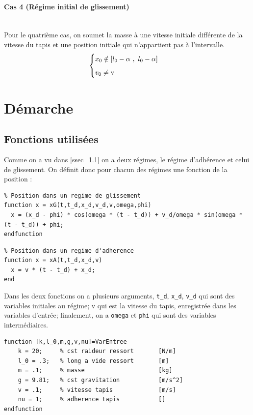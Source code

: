 \documentclass{article}
\begin{document}
\paragraph{Cas 4 (Régime initial de glissement)}\label{par_1.2.0.4}
\mbox{}\\
Pour le quatrième cas, on soumet la masse à une vitesse initiale différente de la vitesse du tapis et une position initiale qui n'appartient pas à l'intervalle.
$$
\begin{cases}
	\vspace{.2cm}
	x_0 \notin [l_0-\alpha~,~l_0-\alpha]\\
	v_0\neq \text{v}
\end{cases}
$$
\newpage
\section{Démarche}\label{sec_2}
\subsection{Fonctions utilisées}\label{ssec_2.1}
Comme on a vu dans \ref{ssec_1.1} on a deux régimes, le régime d'adhérence et celui de glissement. On définit donc pour chacun des régimes une fonction de la position : 

\begin{lstlisting}
% Position dans un regime de glissement
function x = xG(t,t_d,x_d,v_d,v,omega,phi)
  x = (x_d - phi) * cos(omega * (t - t_d)) + v_d/omega * sin(omega * (t - t_d)) + phi;
endfunction
\end{lstlisting}

\begin{lstlisting}
% Position dans un regime d'adherence
function x = xA(t,t_d,x_d,v)
  x = v * (t - t_d) + x_d;
end
\end{lstlisting}

Dans les deux fonctions on a plusieurs arguments, \verb|t_d|, \verb|x_d|, \verb|v_d| qui sont des variables initiales au régime; v qui est la vitesse du tapis, enregistrée dans les variables d'entrée; finalement, on a \verb|omega| et \verb|phi| qui sont des variables intermédiaires. \\
\begin{lstlisting}
function [k,l_0,m,g,v,nu]=VarEntree
	k = 20;		% cst raideur ressort    	[N/m]
	l_0 = .3;	% long a vide ressort    	[m]
	m = .1;		% masse                  	[kg]
	g = 9.81;	% cst gravitation        	[m/s^2]
	v = .1;		% vitesse tapis          	[m/s]
	nu = 1;		% adherence tapis        	[]
endfunction
\end{lstlisting}
\end{document}
